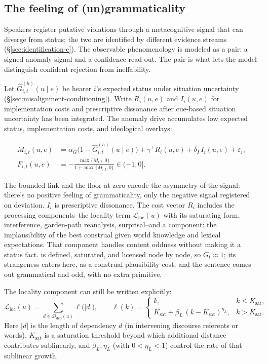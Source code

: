\subsection{The feeling of (un)grammaticality}
\label{sec:feeling-new}

Speakers register putative violations through a metacognitive signal that can diverge from status; the two are identified by different evidence streams (\S\ref{sec:identification-c}). The observable phenomenology is modeled as a pair: a signed anomaly signal and a confidence read-out. The pair is what lets the model distinguish confident rejection from ineffability.

Let $\hat{G}^{(h)}_{i,t}(u\mid e)$ be hearer $i$'s expected status under
situation uncertainty (\S\ref{sec:misalignment-conditioning}). Write
$R_i(u,e)$ and $I_i(u,e)$ for implementation costs and prescriptive dissonance
after cue-based situation uncertainty has been integrated. The anomaly drive
accumulates low expected status, implementation costs, and ideological overlays:

\begin{align}
M_{i,t}(u,e) &= \alpha_G\bigl(1-\hat{G}^{(h)}_{i,t}(u\mid e)\bigr)
  +\gamma^{\top} R_i(u,e)+\delta_I\,I_i(u,e)+\varepsilon_i, \\
F_{i,t}(u,e) &= -\frac{\max\{M_{i,t},0\}}{1+\max\{M_{i,t},0\}}
  \in (-1,0].
\end{align}

The bounded link and the floor at zero encode the asymmetry of the signal:
there's no positive feeling of grammaticality, only the negative signal
registered on deviation. $I_i$ is prescriptive dissonance. The cost vector
$R_i$ includes the processing components--the locality term
$\mathcal{L}_{\mathrm{loc}}(u)$ with its saturating form, interference,
garden-path reanalysis, surprisal--and a
 component: the implausibility of the best construal given
world knowledge and lexical expectations. That component handles content
oddness without making it a status fact.  is defined, saturated, and licensed node by node, so $G_t\approx1$;
its strangeness enters here, as a construal-plausibility cost, and the sentence
comes out grammatical and odd, with no extra primitive.

The locality component can still be written explicitly:
\begin{equation*}
\mathcal{L}_{\mathrm{loc}}(u)=
\sum_{d\in\mathcal{D}_{\mathrm{dep}}(u)}\ell\!\bigl(|d|\bigr),\qquad
\ell(k)=
  \begin{cases}
    k, & k\le K_{\text{sat}},\\[4pt]
    K_{\text{sat}}+\beta_L\,(k-K_{\text{sat}})^{\eta_L}, & k>K_{\text{sat}}.
  \end{cases}
\end{equation*}
Here $|d|$ is the length of dependency $d$ (in intervening discourse referents or
words), $K_{\text{sat}}$ is a saturation threshold beyond which additional
distance contributes sublinearly, and $\beta_L,\eta_L$ (with $0<\eta_L<1$)
control the rate of that sublinear growth.

